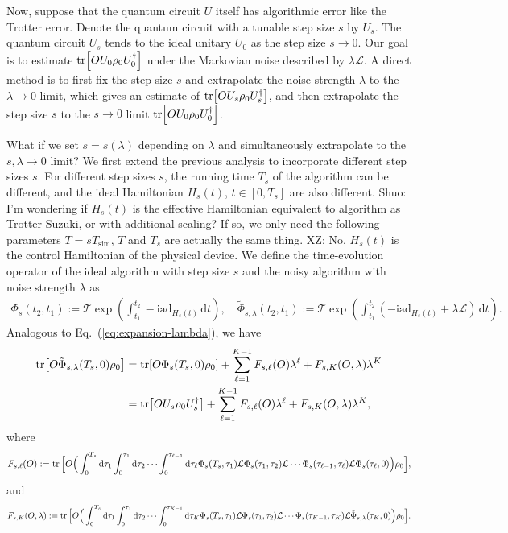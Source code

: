 \documentclass[11pt]{article}
\newcommand{\eq}[1]{(\ref{eq:#1})}
\renewcommand{\i}{\mathrm{i}}
\renewcommand{\d}{\mathrm{d}}
\renewcommand{\L}{\mathcal{L}}
\newcommand{\ad}{\mathrm{ad}}
\newcommand{\T}{\mathcal{T}}
\newcommand{\B}{\Big}
\newcommand{\xz}[1]{{\color{cyan} XZ: #1}}
\newcommand{\sz}[1]{{\color{purple} Shuo: #1}}
\begin{document}
Now, suppose that the quantum circuit $U$ itself has algorithmic error like the Trotter error. Denote the quantum circuit with a tunable step size $s$ by $U_s$. The quantum circuit $U_s$ tends to the ideal unitary $U_0$ as the step size $s\to0$. Our goal is to estimate $\tr[OU_0\rho_0U_0^{\dagger}]$ under the Markovian noise described by $\lambda\L$. A direct method is to first fix the step size $s$ and extrapolate the noise strength $\lambda$ to the $\lambda\to 0$ limit, which gives an estimate of $\tr[OU_s\rho_0 U_s^{\dagger}]$, and then extrapolate the step size $s$ to the $s\to0$ limit $\tr[OU_0\rho_0U_0^{\dagger}]$.

 What if we set $s= s(\lambda)$ depending on $\lambda$ and simultaneously extrapolate to the $s, \lambda \to 0$ limit? We first extend the previous analysis to incorporate different step sizes $s$. For different step sizes $s$, the running time $T_s$ of the algorithm can be different, and the ideal Hamiltonian $H_s(t)$, $t\in [0,T_s]$ are also different. \sz{I'm wondering if $H_s(t)$ is the effective Hamiltonian equivalent to algorithm as Trotter-Suzuki, or with additional scaling? If so, we only need the following parameters $T=sT_{\mathrm{sim}}$, $T$ and $T_s$ are actually the same thing.} \xz{No, $H_s(t)$ is the control Hamiltonian of the physical device.} We define the time-evolution operator of the ideal algorithm with step size $s$ and the noisy algorithm with noise strength $\lambda$ as \begin{align*}
    \Phi_s(t_2,t_1):=\T \exp(\int_{t_1}^{t_2} -\i\ad_{H_s(t)}\,\d t),\quad \tilde{\Phi}_{s,\lambda}(t_2, t_1):=\T \exp(\int_{t_1}^{t_2}(-\i \ad_{H_s(t)}+\lambda \L)\,\d t). 
\end{align*}
Analogous to Eq.~\eq{expansion-lambda}, we have \begin{align}
\label{eq:expansion-s-l}
    \tr[O\tilde{\Phi}_{s,\lambda}(T_s, 0)\rho_0] &=\tr[O\Phi_s(T_s, 0)\rho_0]+\sum_{\ell=1}^{K-1}F_{s,\ell}(O)\lambda^{\ell}+F_{s,K}(O,\lambda)\lambda^K \nonumber \\
    &=\tr[OU_s \rho_0 U_s^{\dagger}] +\sum_{\ell=1}^{K-1}F_{s,\ell}(O)\lambda^{\ell}+F_{s,K}(O,\lambda)\lambda^K,
\end{align}
where \begin{align}
    \label{eq:def-Fsl}
    F_{s,\ell}(O):=\tr\B[O\B(\int_{0}^{T_s} \d \tau_1 \int_{0}^{\tau_1}\d \tau_2 \cdots \int_{0}^{\tau_{\ell-1}} \d \tau_{\ell} \Phi_s(T_s, \tau_1) \L \Phi_s(\tau_1, \tau_2) \L \cdots \Phi_s(\tau_{\ell-1}, \tau_{\ell}) \L\Phi_s(\tau_{\ell},0)\B)\rho_0\Big],
\end{align}
and \begin{align*}
    F_{s, K}(O,\lambda):=\tr\B[O\B(\int_{0}^{T_s} \d \tau_1 \int_{0}^{\tau_1}\d \tau_2 \cdots \int_{0}^{\tau_{K-1}} \d \tau_{K} \Phi_s(T_s, \tau_1) \L \Phi_s(\tau_1, \tau_2) \L \cdots \Phi_s(\tau_{K-1}, \tau_{K}) \L\tilde{\Phi}_{s,\lambda}(\tau_{K},0)\B)\rho_0\B].
\end{align*}
\end{document}
